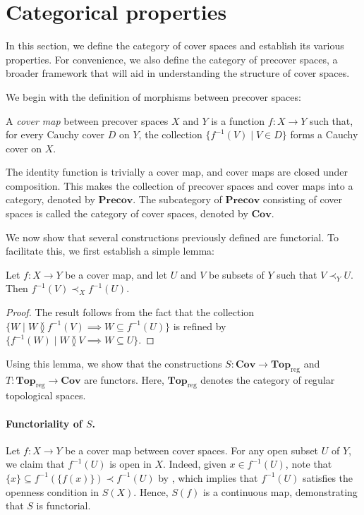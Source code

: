 \documentclass[reqno]{amsart}
\theoremstyle{definition}
\theoremstyle{remark}
\numberwithin{figure}{section}
\newcommand{\overlap}[2]{#1 \between #2}
\newcommand{\rb}{\prec}
\newcommand{\cat}[1]{\mathbf{#1}}
\begin{document}
\section{Categorical properties}
\label{sec:cat}

In this section, we define the category of cover spaces and establish its various properties.
For convenience, we also define the category of precover spaces, a broader framework that will aid in understanding the structure of cover spaces.

We begin with the definition of morphisms between precover spaces:

\begin{defn}
A \emph{cover map} between precover spaces $X$ and $Y$ is a function $f : X \to Y$ such that, for every Cauchy cover $D$ on $Y$, the collection $\{ f^{-1}(V) \mid V \in D \}$ forms a Cauchy cover on $X$.
\end{defn}

The identity function is trivially a cover map, and cover maps are closed under composition.
This makes the collection of precover spaces and cover maps into a category, denoted by $\cat{Precov}$.
The subcategory of $\cat{Precov}$ consisting of cover spaces is called the category of cover spaces, denoted by $\cat{Cov}$.

We now show that several constructions previously defined are functorial.
To facilitate this, we first establish a simple lemma:

\begin{lem}
Let $f : X \to Y$ be a cover map, and let $U$ and $V$ be subsets of $Y$ such that $V \rb_Y U$.
Then $f^{-1}(V) \rb_X f^{-1}(U)$.
\end{lem}
\begin{proof}
The result follows from the fact that the collection $\{ W \mid \overlap{W}{f^{-1}(V)} \implies W \subseteq f^{-1}(U) \}$ is refined by $\{ f^{-1}(W) \mid \overlap{W}{V} \implies W \subseteq U \}$.
\end{proof}

Using this lemma, we show that the constructions $S : \cat{Cov} \to \cat{Top}_\mathrm{reg}$ and $T : \cat{Top}_\mathrm{reg} \to \cat{Cov}$ are functors.
Here, $\cat{Top}_\mathrm{reg}$ denotes the category of regular topological spaces.

\paragraph{Functoriality of $S$.}
Let $f : X \to Y$ be a cover map between cover spaces.
For any open subset $U$ of $Y$, we claim that $f^{-1}(U)$ is open in $X$.
Indeed, given $x \in f^{-1}(U)$, note that $\{x\} \subseteq f^{-1}(\{f(x)\}) \rb f^{-1}(U)$ by ,
which implies that $f^{-1}(U)$ satisfies the openness condition in $S(X)$.
Hence, $S(f)$ is a continuous map, demonstrating that $S$ is functorial.
\end{document}
